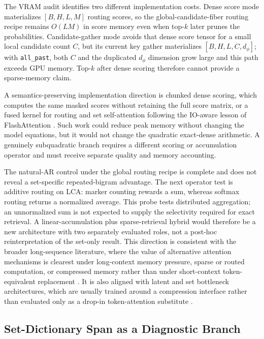 \documentclass{article}
\theoremstyle{plain}
\theoremstyle{definition}
\theoremstyle{remark}
\begin{document}
The VRAM audit identifies two different implementation costs.  Dense score
mode materializes $[B,H,L,M]$ routing scores, so the global-candidate-fiber
routing recipe remains $O(LM)$ in score memory even when top-$k$ later prunes the
probabilities.  Candidate-gather mode avoids that dense score tensor for a
small local candidate count $C$, but its current key gather materializes
$[B,H,L,C,d_\phi]$; with \texttt{all\_past}, both $C$ and the duplicated
$d_\phi$ dimension grow large and this path exceeds GPU memory.  Top-$k$ after
dense scoring therefore cannot provide a sparse-memory claim.

A semantics-preserving implementation direction is chunked dense scoring,
which computes the same masked scores without retaining the full score matrix,
or a fused kernel for routing and set self-attention following the IO-aware
lesson of FlashAttention \citep{dao2022flashattention}.  Such work could reduce
peak memory without changing the model equations, but it would not change the
quadratic exact-dense arithmetic.  A genuinely subquadratic branch requires a
different scoring or accumulation operator and must receive separate quality
and memory accounting.

The natural-AR control under the global routing recipe is complete and does not
reveal a set-specific repeated-bigram advantage.  The next operator test is
additive routing on LCA: marker counting rewards a sum, whereas softmax routing
returns a normalized average.  This probe tests distributed aggregation; an
unnormalized sum is not expected to supply the selectivity required for exact
retrieval.  A linear-accumulation plus sparse-retrieval hybrid would therefore
be a new architecture with two separately evaluated roles, not a post-hoc
reinterpretation of the set-only result.  This direction is consistent with
the broader long-sequence literature,
where the value of alternative attention mechanisms is clearest under
long-context memory pressure, sparse or routed computation, or compressed
memory rather than under short-context token-equivalent replacement
\citep{dai2019transformerxl,rae2019compressive,beltagy2020longformer,zaheer2020bigbird,roy2020routing}.  It is also aligned with latent and set bottleneck
architectures, which are usually trained around a compression interface rather
than evaluated only as a drop-in token-attention substitute
\citep{lee2019settransformer,jaegle2021perceiverio}.

\subsection{Set-Dictionary Span as a Diagnostic Branch}
\label{sec:future-set-dictionary}
\end{document}
